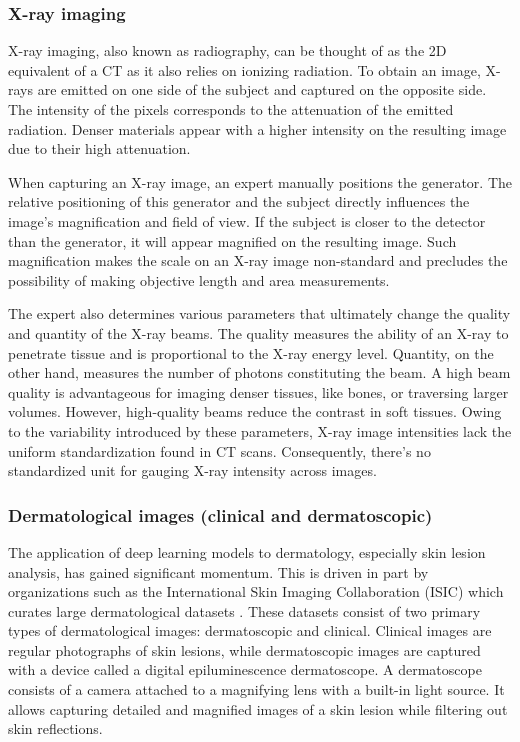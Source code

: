 \subsubsection{X-ray imaging}

X-ray imaging, also known as radiography, can be thought of as the 2D equivalent of a CT as it also relies on ionizing radiation. To obtain an image, X-rays are emitted on one side of the subject and captured on the opposite side. The intensity of the pixels corresponds to the attenuation of the emitted radiation. Denser materials appear with a higher intensity on the resulting image due to their high attenuation.

When capturing an X-ray image, an expert manually positions the generator. The relative positioning of this generator and the subject directly influences the image's magnification and field of view. If the subject is closer to the detector than the generator, it will appear magnified on the resulting image. Such magnification makes the scale on an X-ray image non-standard and precludes the possibility of making objective length and area measurements.

The expert also determines various parameters that ultimately change the quality and quantity of the X-ray beams. The quality measures the ability of an X-ray to penetrate tissue and is proportional to the X-ray energy level. Quantity, on the other hand, measures the number of photons constituting the beam. A high beam quality is advantageous for imaging denser tissues, like bones, or traversing larger volumes. However, high-quality beams reduce the contrast in soft tissues. Owing to the variability introduced by these parameters, X-ray image intensities lack the uniform standardization found in CT scans. Consequently, there's no standardized unit for gauging X-ray intensity across images.

\subsubsection{Dermatological images (clinical and dermatoscopic)}

The application of deep learning models to dermatology, especially skin lesion analysis, has gained significant momentum. This is driven in part by organizations such as the International Skin Imaging Collaboration (ISIC) which curates large dermatological datasets \cite{rotembergPatientcentricDatasetImages2021}. These datasets consist of two primary types of dermatological images: dermatoscopic and clinical. Clinical images are regular photographs of skin lesions, while dermatoscopic images are captured with a device called a digital epiluminescence dermatoscope. A dermatoscope consists of a camera attached to a magnifying lens with a built-in light source. It allows capturing detailed and magnified images of a skin lesion while filtering out skin reflections.

